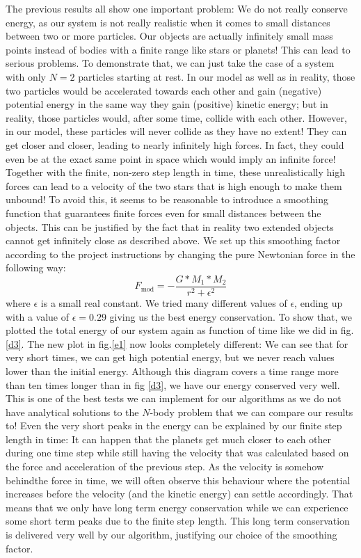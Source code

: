 \documentclass[10pt,a4paper]{article}
\begin{document}
The previous results all show one important problem: We do not really conserve energy, as our system is not really realistic when it comes to small distances between two or more particles. Our objects are actually infinitely small mass points instead of bodies with a finite range like stars or planets! This can lead to serious problems. To demonstrate that, we can just take the case of a system with only $N=2$ particles starting at rest. In our model as well as in reality, those two particles would be accelerated towards each other and gain (negative) potential energy in the same way they gain (positive) kinetic energy; but in reality, those particles would, after some time, collide with each other. However, in our model, these particles will never collide as they have no extent! They can get closer and closer, leading to nearly infinitely high forces. In fact, they could even be at the exact same point in space which would imply an infinite force! Together with the finite, non-zero step length in time, these unrealistically high forces can lead to a velocity of the two stars that is high enough to make them unbound! To avoid this, it seems to be reasonable to introduce a smoothing function that guarantees finite forces even for small distances between the objects. This can be justified by the fact that in reality two extended objects cannot get infinitely close as described above. We set up this smoothing factor according to the project instructions by changing the pure Newtonian force in the following way:
\begin{equation}
F_\mathrm{mod}=-\frac{G*M_1*M_2}{r^2+\epsilon^2}
\end{equation}
where $\epsilon$ is a small real constant. We tried many different values of $\epsilon$, ending up with a value of $\epsilon=0.29$ giving us the best energy conservation. To show that, we plotted the total energy of our system again as function of time like we did in fig. \ref{d3}. The new plot in fig.\ref{e1} now looks completely different: We can see that for very short times, we can get high potential energy, but we never reach values lower than the initial energy. Although this diagram covers a time range more than ten times longer than in fig \ref{d3}, we have our energy conserved very well. This is one of the best tests we can implement for our algorithms as we do not have analytical solutions to the $N$-body problem that we can compare our results to! Even the very short peaks in the energy can be explained by our finite step length in time: It can happen that the planets get much closer to each other during one time step while still having the velocity that was calculated based on the force and acceleration of the previous step. As the velocity is somehow \glqq behind\grqq the force in time, we will often observe this behaviour where the potential increases before the velocity (and the kinetic energy) can settle accordingly. That means that we only have long term energy conservation while we can experience some short term peaks due to the finite step length. This long term conservation is delivered very well by our algorithm, justifying our choice of the smoothing factor.
\end{document}
